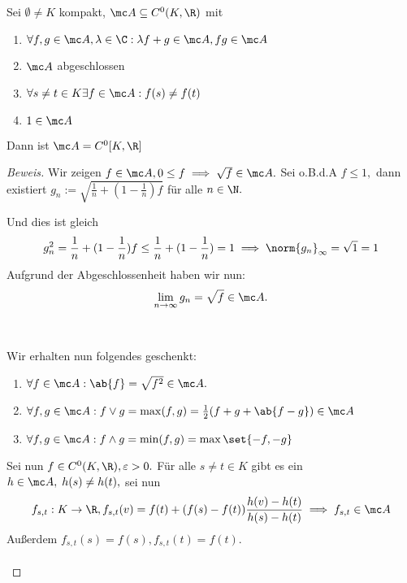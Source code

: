 \begin{theorem} \label{algebraquatsch} Sei $\emptyset \not= K$ kompakt, $\mc A \subseteq C^0(K, \R)$ mit 
	
	\begin{enumerate}
		
		\item $\forall f, g \in \mc A, \lambda \in \C: \lambda f +g \in \mc A, fg \in \mc A$
		
		\item $\mc A$ abgeschlossen
		
		\item $\forall s \not= t \in K \exists f \in \mc A: f(s) \not= f(t)$
		
		\item $1 \in \mc A$
		
	\end{enumerate}
	
	Dann ist $\mc A = C^0[K, \R]$
	
	\begin{proof}[Beweis] Wir zeigen $f \in \mc A, 0 \leq f \implies \sqrt{f} \in \mc A.$ Sei o.B.d.A $f \leq 1,$ dann existiert $g_n := \sqrt{\frac{1}{n}+(1- \frac{1}{n})f}$ für alle $n \in \N.$
		
		 Und dies ist gleich \[g_n^2 = \frac{1}{n}+ (1- \frac{1}{n})f \leq \frac{1}{n}+(1- \frac{1}{n}) = 1 \implies \norm{g_n}_{\infty} = \sqrt{1} = 1\] Aufgrund der Abgeschlossenheit haben wir nun: \[\lim_{n \to \infty} g_n = \sqrt{f} \in \mc A.\] \\ \\
		
		Wir erhalten nun folgendes geschenkt:
		
		\begin{enumerate}
			
			\item $\forall f \in \mc A: \ab{f} = \sqrt{f^2} \in \mc A.$
			\item $\forall f, g \in \mc A: f \lor g = \max(f, g) = \frac{1}{2}(f+g+ \ab{f-g}) \in \mc A$
			\item $\forall f, g \in \mc A: f \land g = \min(f, g) = \max{\set{-f, -g}}$
			
		\end{enumerate}
		
		Sei nun $f \in C^0(K, \R), \varepsilon > 0.$ Für alle $s \not= t \in  K$ gibt es ein $h \in \mc A,\; h(s) \not= h(t),$ sei nun \[f_{s, t}: K \to \R, f_{s,t}(v) = f(t)+(f(s)-f(t))\frac{h(v)-h(t)}{h(s)-h(t)} \implies f_{s, t} \in \mc A\] Außerdem $f_{s, t}(s) = f(s), f_{s, t}(t) = f(t).$ \\ \\
		

\end{proof}
\end{theorem}
